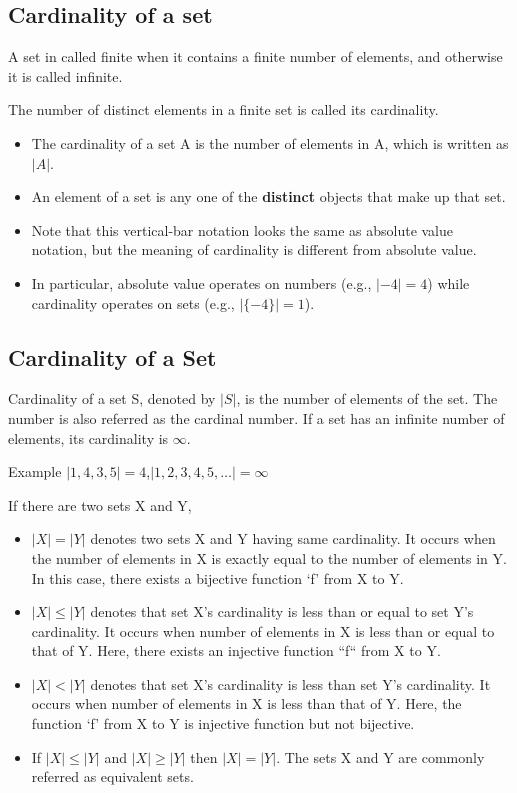 
\subsection{Cardinality of a set}
A set in called finite when it contains a finite number of elements, and 
otherwise it is called infinite.

The number of distinct elements in a finite set is called its cardinality.


\begin{itemize}
\item The cardinality of a set A is the number of elements in A, which is written as $|A|$.
\item An element of a set is any one of the \textbf{distinct} objects that make up that set.

\end{itemize}


\begin{itemize}

\item Note that this vertical-bar notation looks the same as absolute value notation, 
but the meaning of cardinality is different from absolute value.

\item In particular, absolute value operates on numbers (e.g., $|-4| = 4$) 
while cardinality operates on sets (e.g., $|\{-4\}| = 1$).
\end{itemize}



\subsection{Cardinality of a Set}
Cardinality of a set S, denoted by $|S|$, is the number of elements of the set. The number is also referred as the cardinal number. If a set has an infinite number of elements, its cardinality is $\infty$.

Example  $|{1,4,3,5}|=4$,$|{1,2,3,4,5,\ldots}|=\infty$

If there are two sets X and Y,
\begin{itemize}
\item $|X|=|Y|$ denotes two sets X and Y having same cardinality. It occurs when the number of elements in X is exactly equal to the number of elements in Y. In this case, there exists a bijective function ‘f’ from X to Y.
\item 
$|X|\leq|Y|$ denotes that set X's cardinality is less than or equal to set Y’s cardinality. It occurs when number of elements in X is less than or equal to that of Y. Here, there exists an injective function ``f`` from X to Y.
\item 
$|X|<|Y|$ denotes that set X’s cardinality is less than set Y’s cardinality. It occurs when number of elements in X is less than that of Y. Here, the function ‘f’ from X to Y is injective function but not bijective.
\item 
If $|X|\leq|Y|$ and $|X|\geq|Y|$ then $|X|=|Y|$. The sets X and Y are commonly referred as equivalent sets.
\end{itemize}



